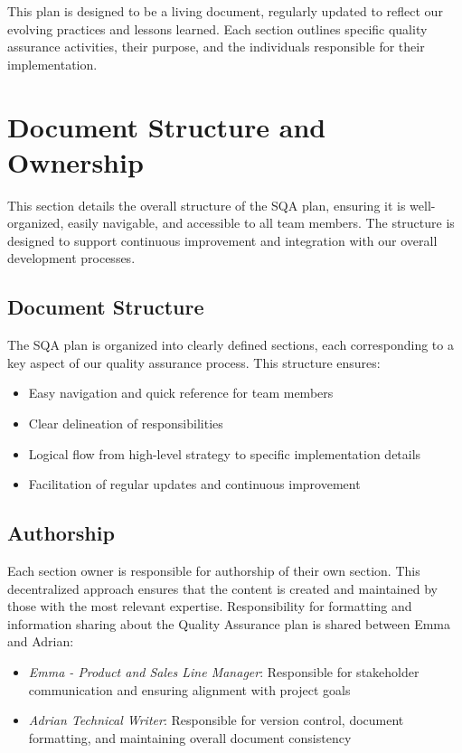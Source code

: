 \documentclass{article}
\begin{document}
This plan is designed to be a living document, regularly updated to reflect our evolving practices and lessons learned. Each section outlines specific quality assurance activities, their purpose, and the individuals responsible for their implementation.

\newpage
\section{Document Structure and Ownership}

This section details the overall structure of the SQA plan, ensuring it is well-organized, easily navigable, and accessible to all team members. The structure is designed to support continuous improvement and integration with our overall development processes.

\subsection{Document Structure}
The SQA plan is organized into clearly defined sections, each corresponding to a key aspect of our quality assurance process. This structure ensures:

\begin{itemize}
    \item Easy navigation and quick reference for team members
    \item Clear delineation of responsibilities
    \item Logical flow from high-level strategy to specific implementation details
    \item Facilitation of regular updates and continuous improvement
\end{itemize}

\subsection{Authorship}
Each section owner is responsible for authorship of their own section. This decentralized approach ensures that the content is created and maintained by those with the most relevant expertise. Responsibility for formatting and information sharing about the Quality Assurance plan is shared between Emma and Adrian:

\begin{itemize}
    \item \textit{Emma - Product and Sales Line Manager}: Responsible for stakeholder communication and ensuring alignment with project goals
    \item \textit{Adrian Technical Writer}: Responsible for version control, document formatting, and maintaining overall document consistency
\end{itemize}
\end{document}
